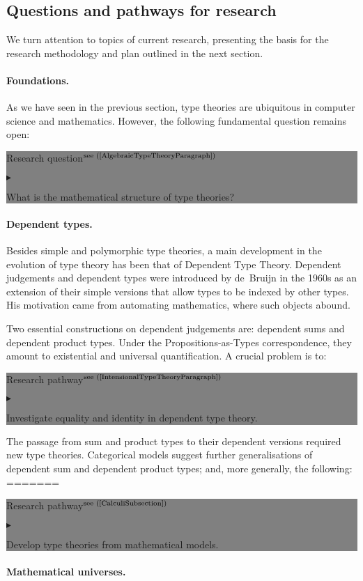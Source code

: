 \documentclass[11pt,twocolumn]{article}
\newenvironment{btritemize}
  {\begin{list}{\btr}
  {\setlength{\topsep}{2pt}
   \setlength{\partopsep}{2pt}
   \setlength{\itemsep}{2.5pt}
   \setlength{\parsep}{2.5pt}
   \setlength{\leftmargin}{1em}
   \setlength{\labelwidth}{.5em}}}
  {\end{list}}
\newcommand{\mytextsf}[1]{\textsf{\small #1}}
\newcommand{\btr}{$\blacktriangleright$}
\newcommand{\reqpsize}{8.113395cm}%
\newcommand{\req}[2]{\begin{center}\colorbox{grey}{\begin{minipage}{\reqpsize} 
  \mytextsf{Research question}\hfill$^{\mbox{\scriptsize see (#1) }}$\\[-5.5mm]
  \begin{btritemize}
  \item #2
  \end{btritemize}
\end{minipage}}\end{center}}
\newcommand{\rep}[2]{\begin{center}\colorbox{grey}{\begin{minipage}{\reqpsize}
  \mytextsf{Research pathway}\hfill$^{\mbox{\scriptsize see (#1) }}$\\[-5.5mm]
  \begin{btritemize}
  \item #2
  \end{btritemize}
\end{minipage}}\end{center}}
\begin{document}
\subsection{Questions and pathways for research}

We turn attention to topics of current research, presenting the basis for
the research methodology and plan outlined in the next section.

\paragraph*{Foundations.}

As we have seen in the previous section, type theories are ubiquitous in
computer science and mathematics.  However, the following fundamental question
remains open:
\req{\ref{AlgebraicTypeTheoryParagraph}}
{What is the mathematical structure of type theories?}

\paragraph*{Dependent types.}

Besides simple and polymorphic type theories, a main development in the
evolution of type theory has been that of Dependent Type Theory.  Dependent
judgements and dependent types were introduced by de~Bruijn %
in the 1960s as an extension of their simple versions that allow types to be
indexed by other types.  His motivation came from automating mathematics,
where such objects abound.  

Two essential constructions on dependent judgements are: dependent sums and
dependent product types.  Under the Propositions-as-Types correspondence, they
amount to existential and universal quantification.  A crucial problem is to:
\rep{\ref{IntensionalTypeTheoryParagraph}}
  {Investigate equality and identity in dependent type theory.}

The passage from sum and product types to their dependent versions required new
type theories.  Categorical models suggest further generalisations of
dependent sum and dependent product types; and, more generally, the following:
=======
\rep{\ref{CalculiSubsection}}
  {Develop type theories from mathematical models.}

\paragraph*{Mathematical universes.}
\end{document}
